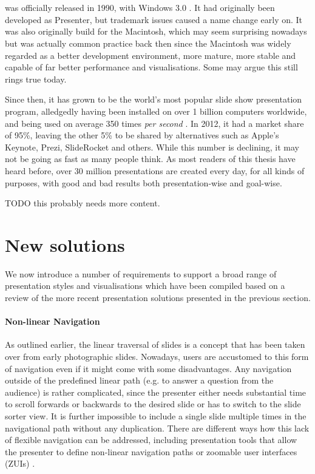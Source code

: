   \section{\ppt*}

   \ppt* was officially released in 1990, with Windows 3.0 \citep{austin-1}. It
   had originally been developed as Presenter, but trademark issues caused a
   name change early on. It was also originally build for the Macintosh, which
   may seem surprising nowadays but was actually common practice back then
   since the Macintosh was widely regarded as a better development environment,
   more mature, more stable and capable of far better performance and
   visualisations. Some may argue this still rings true today.

   Since then, it has grown to be the world's most popular slide show
   presentation program, alledgedly having been installed on over 1 billion
   computers worldwide, and being used on average 350 times \emph{per second}
   \citep{parks-1}. In 2012, it had a market share of 95\%, leaving the other
   5\% to be shared by alternatives such as Apple's Keynote, Prezi, SlideRocket
   and others. While this number is declining, it may not be going as fast as
   many people think. As most readers of this thesis have heard before, over 30
   million \ppt presentations are created every day, for all kinds of purposes,
   with good and bad results both presentation-wise and goal-wise.

   TODO this probably needs more content.

  \section{New solutions}

   We now introduce a number of requirements to support a broad range of
   presentation styles and visualisations which have been compiled based on a
   review of the more recent presentation solutions presented in the previous
   section.

     \paragraph{Non-linear Navigation} As outlined earlier, the linear
      traversal of slides is a concept that has been taken over from early
      photographic slides. Nowadays, users are accustomed to this form of
      navigation even if it might come with some disadvantages. Any navigation
      outside of the predefined linear path (e.g. to answer a question from the
      audience) is rather complicated, since the presenter either needs
      substantial time to scroll forwards or backwards to the desired slide or
      has to switch to the slide sorter view. It is further impossible to
      include a single slide multiple times in the navigational path without
      any duplication. There are different ways how this lack of flexible
      navigation can be addressed, including presentation tools that allow the
      presenter to define non-linear navigation paths \citep{spicer-1}
      \citep{edge-1} or zoomable user interfaces (ZUIs) \citep{good-1}
      \citep{lichtschlag-1} \citep{haller-1}.

